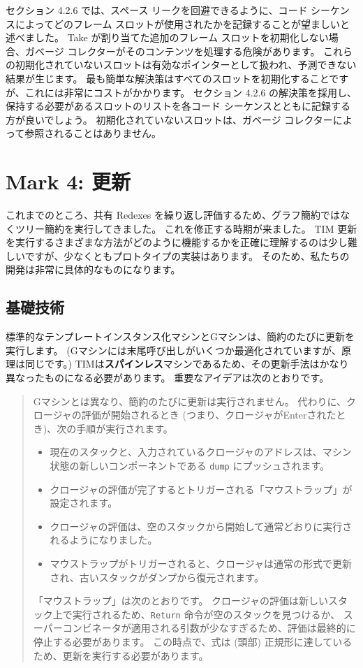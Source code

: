 \documentclass{jbook}
\begin{document}
セクション 4.2.6 では、スペース リークを回避できるように、コード シーケンスによってどのフレーム スロットが使用されたかを記録することが望ましいと述べました。
Take が割り当てた追加のフレーム スロットを初期化しない場合、ガベージ コレクターがそのコンテンツを処理する危険があります。
これらの初期化されていないスロットは有効なポインターとして扱われ、予測できない結果が生じます。
最も簡単な解決策はすべてのスロットを初期化することですが、これには非常にコストがかかります。
セクション 4.2.6 の解決策を採用し、保持する必要があるスロットのリストを各コード シーケンスとともに記録する方が良いでしょう。
初期化されていないスロットは、ガベージ コレクターによって参照されることはありません。

\newpage

\section{Mark 4: 更新}

これまでのところ、共有 Redexes を繰り返し評価するため、グラフ簡約ではなくツリー簡約を実行してきました。
これを修正する時期が来ました。
TIM 更新を実行するさまざまな方法がどのように機能するかを正確に理解するのは少し難しいですが、少なくともプロトタイプの実装はあります。
そのため、私たちの開発は非常に具体的なものになります。

\subsection{基礎技術}

標準的なテンプレートインスタンス化マシンとGマシンは、簡約のたびに更新を実行します。
(Gマシンには末尾呼び出しがいくつか最適化されていますが、原理は同じです。)
TIMは\textbf{スパインレス}マシンであるため、その更新手法はかなり異なったものになる必要があります。
重要なアイデアは次のとおりです。

\begin{quote}
	Gマシンとは異なり、簡約のたびに更新は実行されません。
	代わりに、クロージャの評価が開始されるとき (つまり、クロージャがEnterされたとき)、次の手順が実行されます。

	\begin{itemize}
		\item 現在のスタックと、入力されているクロージャのアドレスは、マシン状態の新しいコンポーネントである \texttt{dump} にプッシュされます。
		\item クロージャの評価が完了するとトリガーされる「マウストラップ」が設定されます。
		\item クロージャの評価は、空のスタックから開始して通常どおりに実行されるようになりました。
		\item マウストラップがトリガーされると、クロージャは通常の形式で更新され、古いスタックがダンプから復元されます。
	\end{itemize}

	「マウストラップ」は次のとおりです。
	クロージャの評価は新しいスタック上で実行されるため、\texttt{Return} 命令が空のスタックを見つけるか、
	スーパーコンビネータが適用される引数が少なすぎるため、評価は最終的に停止する必要があります。
	この時点で、式は (頭部) 正規形に達しているため、更新を実行する必要があります。
\end{quote}
\end{document}
